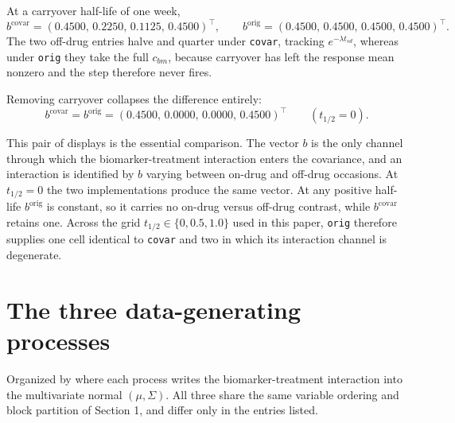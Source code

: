 \documentclass[11pt]{article}
\begin{document}
At a carryover half-life of one week,
\[
b^{\text{covar}} = (0.4500,\, 0.2250,\, 0.1125,\, 0.4500)^{\top},
\qquad
b^{\text{orig}} = (0.4500,\, 0.4500,\, 0.4500,\, 0.4500)^{\top}.
\]
The two off-drug entries halve and quarter under \texttt{covar},
tracking $e^{-\lambda t_{sd}}$, whereas under \texttt{orig} they take
the full $c_{bm}$, because carryover has left the response mean
nonzero and the step therefore never fires.

Removing carryover collapses the difference entirely:
\[
b^{\text{covar}} = b^{\text{orig}} =
(0.4500,\, 0.0000,\, 0.0000,\, 0.4500)^{\top}
\qquad (t_{1/2} = 0).
\]

This pair of displays is the essential comparison. The vector $b$ is
the only channel through which the biomarker-treatment interaction
enters the covariance, and an interaction is identified by $b$ varying
between on-drug and off-drug occasions. At $t_{1/2} = 0$ the two
implementations produce the same vector. At any positive half-life
$b^{\text{orig}}$ is constant, so it carries no on-drug versus
off-drug contrast, while $b^{\text{covar}}$ retains one. Across the
grid $t_{1/2} \in \{0, 0.5, 1.0\}$ used in this paper, \texttt{orig}
therefore supplies one cell identical to \texttt{covar} and two in
which its interaction channel is degenerate.

\section{The three data-generating processes}

Organized by where each process writes the biomarker-treatment
interaction into the multivariate normal $(\mu, \Sigma)$. All three
share the same variable ordering and block partition of Section
1, and differ only in the entries listed.
\end{document}
